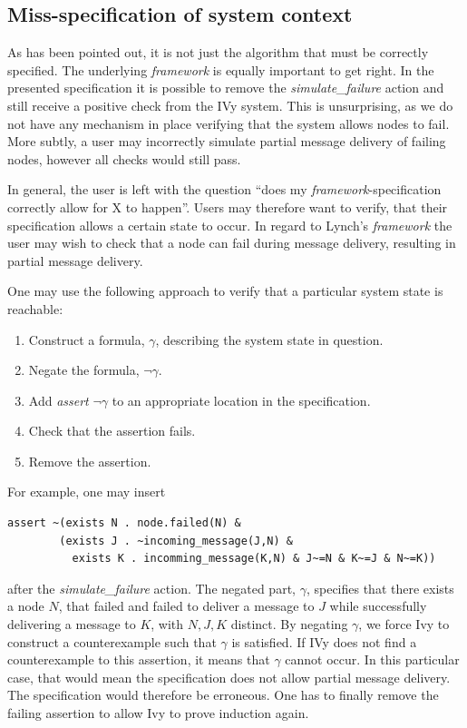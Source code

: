 \documentclass[fleqn]{article}
\begin{document}
\subsection{Miss-specification of system context}
As has been pointed out, it is not just the algorithm that must be correctly specified. The underlying \textit{framework} is equally important to get right. In the presented specification it is possible to remove the \textit{simulate\_failure} action and still receive a positive check from the IVy system. This is unsurprising, as we do not have any mechanism in place verifying that the system allows nodes to fail. More subtly, a user may incorrectly simulate partial message delivery of failing nodes, however all checks would still pass.

In general, the user is left with the question ``does my \textit{framework}-specification correctly allow for X to happen''.  Users may therefore want to verify, that their specification allows a certain state to occur. In regard to Lynch's \textit{framework} the user may wish to check that a node can fail during message delivery, resulting in partial message delivery.

One may use the following approach to verify that a particular system state is reachable:
\begin{enumerate}
  \item Construct a formula, $\gamma$, describing the system state in question.
  \item Negate the formula, $\neg\gamma$.
  \item Add \textit{assert} $\neg\gamma$ to an appropriate location in the specification.
  \item Check that the assertion fails.
  \item Remove the assertion.
\end{enumerate}

\noindent For example, one may insert
\begin{mdframed}[nobreak=true, backgroundcolor=light-gray, roundcorner=10pt,leftmargin=1, rightmargin=1, innerleftmargin=15, innertopmargin=15,innerbottommargin=15, outerlinewidth=1, linecolor=light-gray]
\begin{lstlisting}
assert ~(exists N . node.failed(N) &
        (exists J . ~incoming_message(J,N) &
          exists K . incomming_message(K,N) & J~=N & K~=J & N~=K))
\end{lstlisting}
\end{mdframed}
after the \textit{simulate\_failure} action. The negated part, $\gamma$, specifies that there exists a node $N$, that failed and failed to deliver a message to $J$ while successfully delivering a message to $K$, with $N,J,K$ distinct. By negating $\gamma$, we force Ivy to construct a counterexample such that $\gamma$ is satisfied. If IVy does not find a counterexample to this assertion, it means that $\gamma$ cannot occur. In this particular case, that would mean the specification does not allow partial message delivery. The specification would therefore be erroneous. One has to finally remove the failing assertion to allow Ivy to prove induction again.
\end{document}
